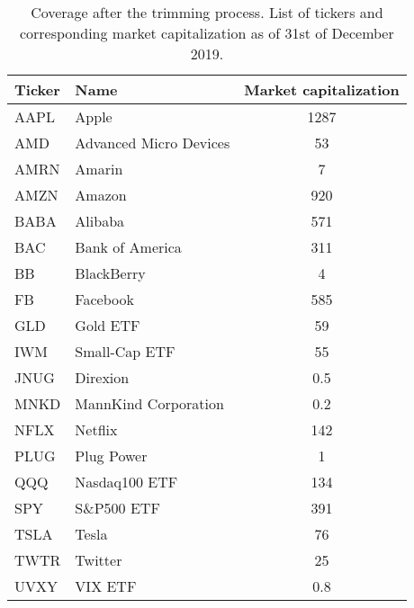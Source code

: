 \begin{table}[h]
\centering
\begin{tabular}{l|l|c}
Ticker & Name                    & Market capitalization\\ \hline \hline
AAPL   & Apple                   & 1287\\
AMD    & Advanced Micro Devices  & 53 \\
AMRN   & Amarin                  & 7 \\
AMZN   & Amazon                  & 920 \\
BABA   & Alibaba                 & 571 \\
BAC    & Bank of America         & 311 \\
BB     & BlackBerry              & 4 \\
FB     & Facebook                & 585 \\
GLD    & Gold ETF                & 59 \\
IWM    & Small-Cap ETF           & 55 \\
JNUG   & Direxion                & 0.5 \\
MNKD   & MannKind Corporation    & 0.2 \\
NFLX   & Netflix                 & 142 \\
PLUG   & Plug Power              & 1 \\
QQQ    & Nasdaq100 ETF           & 134\\
SPY    & S\&P500 ETF             & 391 \\
TSLA   & Tesla                   & 76 \\
TWTR   & Twitter                 & 25 \\
UVXY   & VIX ETF                 & 0.8 \\
\end{tabular}
\caption{Coverage after the trimming process. List of tickers and corresponding market capitalization as of 31st of December 2019.}
\label{tab:listcov}
\end{table}

%

\newpage
